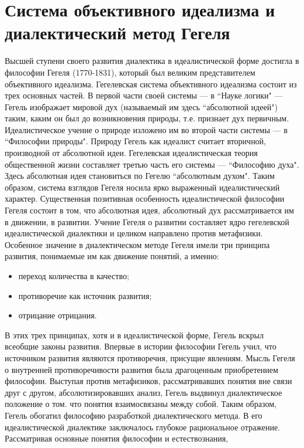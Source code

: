 \documentclass[12pt]{article}
\begin{document}
\section{Система объективного идеализма и диалектический метод Гегеля}
Высшей  ступени  своего  развития  диалектика  в  идеалистической  форме  достигла  в  философии  Гегеля
(1770-1831), который был великим представителем объективного идеализма. Гегелевская система объективного
идеализма состоит из трех основных частей.
В первой части своей системы --- в ``Науке логики" --- Гегель изображает мировой дух (называемый им здесь
``абсолютной идеей") таким, каким он был до возникновения природы, т.е. признает дух первичным.
Идеалистическое учение о природе изложено им во второй части системы --- в ``Философии природы". Природу
Гегель как идеалист считает вторичной, производной от абсолютной идеи.
Гегелевская идеалистическая теория общественной жизни составляет третью часть его системы --- ``Философию
духа". Здесь абсолютная идея становиться по Гегелю ``абсолютным духом".
Таким образом, система взглядов Гегеля носила ярко выраженный идеалистический характер. Существенная
позитивная особенность идеалистической философии Гегеля состоит в том, что абсолютная идея, абсолютный
дух  рассматривается  им  в  движении,  в  развитии.  Учение  Гегеля  о  развитии  составляет  ядро  гегелевской
идеалистической диалектики и целиком направлено против метафизики. Особенное значение в диалектическом
методе  Гегеля  имели  три  принципа  развития,  понимаемые  им  как  движение  понятий,  а  именно:
\begin{itemize}
 \item переход
количества в качество;
\item противоречие как источник развития;
\item отрицание отрицания.
\end{itemize}
В этих трех принципах, хотя и в идеалистической форме, Гегель вскрыл всеобщие законы развития. Впервые в
истории философии Гегель учил, что источником развития являются противоречия, присущие явлениям. Мысль
Гегеля о внутренней противоречивости развития была драгоценным приобретением философии.
Выступая  против  метафизиков,  рассматривавших  понятия  вне  связи  друг  с  другом,  абсолютизировавших 
анализ, Гегель выдвинул диалектическое положение о том. что понятия взаимосвязаны между собой. Таким
образом, Гегель обогатил философию разработкой диалектического метода. В его идеалистической диалектике
заключалось глубокое рациональное отражение. Рассматривая основные понятия философии и естествознания,
\end{document}
